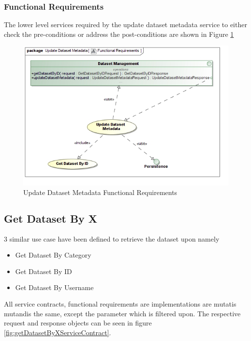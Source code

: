 \subsubsection{Functional Requirements}
The lower level services required by the update dataset metadata service to
either check the pre-conditions or address the post-conditions are shown in 
Figure \ref{fig:UpdateDatasetMetadataUseCase}
\begin{figure}[H]
	\begin{center}
		\includegraphics[scale=0.38]{../Diagrams and Charts/Repository Management/Update Dataset Metadata Functional Requirements.jpg}
		\caption{Update Dataset Metadata Functional Requirements}
		\label{fig:UpdateDatasetMetadataUseCase}
	\end{center}
\end{figure}



\subsection{Get Dataset By X}
3 similar use case have been defined to retrieve the dataset upon namely
\begin{itemize}
  \item Get Dataset By Category
  \item Get Dataset By ID
  \item Get Dataset By Username
\end{itemize}

All service contracts, functional requirements are implementations are mutatis 
mutandis the same, except the parameter which is filtered upon. The respective
request and response objects can be seen in figure \ref{fig:getDatasetByXServiceContract}.

